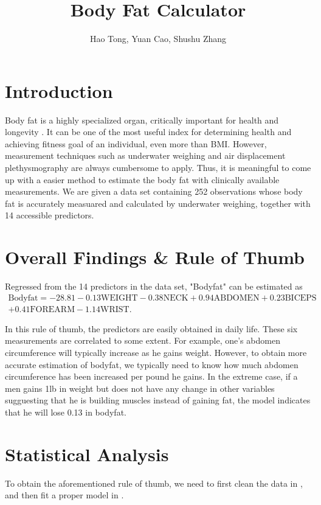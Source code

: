\documentclass[11pt, letterpaper]{article}
\title{Body Fat Calculator}
\author{Hao Tong, Yuan Cao, Shushu Zhang}
\begin{document}
\maketitle

\section{Introduction}

Body fat is a highly specialized organ, critically important for health and longevity \cite{ludwig2016always}. It can be one of the most useful index for determining health and achieving fitness goal of an individual, even more than BMI. However, measurement techniques such as underwater weighing and air displacement plethysmography are always cumbersome to apply. Thus, it is meaningful to come up with a easier method to estimate the body fat with clinically available measurements. We are given a data set containing 252 observations whose body fat is accurately measuared and calculated by underwater weighing, together with 14 accessible predictors. 

\section{Overall Findings \& Rule of Thumb}
\label{sec:2}
Regressed from the 14 predictors in the data set, "Bodyfat" can be estimated as
\begin{equation}\label{eq:model}
\begin{aligned}
\mathrm{Bodyfat}=
-28.81-0.13\mathrm{WEIGHT}-0.38\mathrm{NECK}+0.94\mathrm{ABDOMEN}+0.23\mathrm{BICEPS}\\
+0.41\mathrm{FOREARM}-1.14\mathrm{WRIST}.
\end{aligned}
\end{equation}
 
In this rule of thumb, the predictors are easily obtained in daily life. These six measurements are correlated to some extent. For example, one's abdomen circumference will typically increase as he gains weight. However, to obtain more accurate estimation of bodyfat, we typically need to know how much abdomen circumference has been increased per pound he gains. In the extreme case, if a men gains 1lb in weight but does not have any change in other variables sugguesting that he is building muscles instead of gaining fat, the model indicates that he will lose 0.13 in bodyfat. 


\section{Statistical Analysis}
To obtain the aforementioned rule of thumb, we need to first clean the data in , and then fit a proper model in . 
\end{document}
